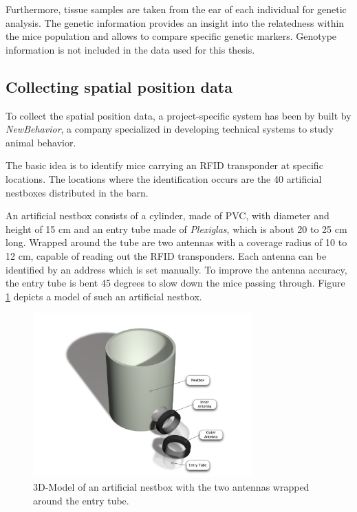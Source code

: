 Furthermore, tissue samples are taken from the ear of each individual for genetic analysis. The genetic information provides an insight into the relatedness within the mice population and allows to compare specific genetic markers. Genotype information is not included in the data used for this thesis.

\subsection{Collecting spatial position data}
\label{subsec:collectspatialpos}

To collect the spatial position data, a project-specific system has been by built by \textit{NewBehavior}, a company specialized in developing technical systems to study animal behavior.

The basic idea is to identify mice carrying an RFID transponder at specific locations. The locations where the identification occurs are the 40 artificial nestboxes distributed in the barn. 

An artificial nestbox consists of a cylinder, made of \ac{PVC}, with diameter and height of 15 cm and an entry tube made of \textit{Plexiglas}, which is about 20 to 25 cm long. Wrapped around the tube are two antennas with a coverage radius of 10 to 12 cm, capable of reading out the RFID transponders. Each antenna can be identified by an address which is set manually. To improve the antenna accuracy, the entry tube is bent 45 degrees to slow down the mice passing through. Figure \ref{fig:artNestbox} depicts a model of such an artificial nestbox.

\begin{figure}[htbp]	
\centering	
\includegraphics[width=0.75\textwidth]{assets/pdf/box_schema.pdf}	
\caption[3D-Model of an artificial nestbox]{3D-Model of an artificial nestbox with the two antennas wrapped around the entry tube.}
\label{fig:artNestbox}
\end{figure}

